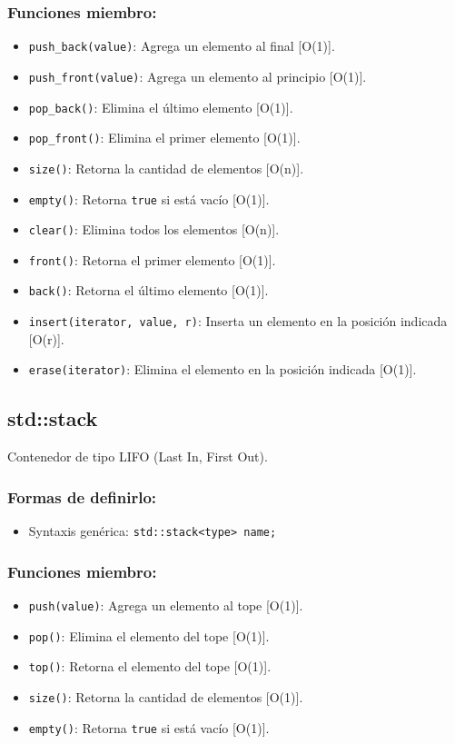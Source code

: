 \subsubsection*{Funciones miembro:}
\begin{itemize}
  \item \texttt{push\_back(value)}: Agrega un elemento al final [O(1)].
  \item \texttt{push\_front(value)}: Agrega un elemento al principio [O(1)].
  \item \texttt{pop\_back()}: Elimina el último elemento [O(1)].
  \item \texttt{pop\_front()}: Elimina el primer elemento [O(1)].
  \item \texttt{size()}: Retorna la cantidad de elementos [O(n)].
  \item \texttt{empty()}: Retorna \texttt{true} si está vacío [O(1)].
  \item \texttt{clear()}: Elimina todos los elementos [O(n)].
  \item \texttt{front()}: Retorna el primer elemento [O(1)].
  \item \texttt{back()}: Retorna el último elemento [O(1)].
  \item \texttt{insert(iterator, value, r)}: Inserta un elemento en la posición indicada [O(r)].
  \item \texttt{erase(iterator)}: Elimina el elemento en la posición indicada [O(1)]. 
\end{itemize}

\subsection{std::stack}
\label{subsec:std_stack}
Contenedor de tipo LIFO (Last In, First Out). 

\subsubsection*{Formas de definirlo:}
\begin{itemize}
  \item Syntaxis genérica: \texttt{std::stack<type> name;}
\end{itemize}

\subsubsection*{Funciones miembro:}
\begin{itemize}
  \item \texttt{push(value)}: Agrega un elemento al tope [O(1)].
  \item \texttt{pop()}: Elimina el elemento del tope [O(1)].
  \item \texttt{top()}: Retorna el elemento del tope [O(1)].
  \item \texttt{size()}: Retorna la cantidad de elementos [O(1)].
  \item \texttt{empty()}: Retorna \texttt{true} si está vacío [O(1)]. 
\end{itemize}

